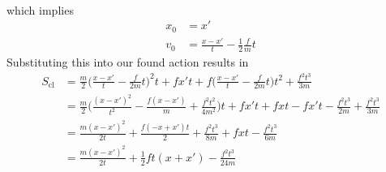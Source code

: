 \documentclass[../principles-of-quantum-mechanics.tex]{subfiles}
\begin{document}
\begin{questions}
\begin{solution}
\begin{align*}
			\end{align*}
			which implies
			\begin{align*}
				x_0 &= x' \\
				v_0 &= \frac{x - x'}{t} - \frac{1}{2}\frac{f}{m}t
			\end{align*}
			Substituting this into our found action results in
			\begin{align*}
				S_{\text{cl}} &= \frac{m}{2}\Big(\frac{x - x'}{t} - \frac{f}{2m}t\Big)^2t + fx't + f\Big(\frac{x - x'}{t} - \frac{f}{2m}t\Big)t^2 + \frac{f^2t^3}{3m} \\
				&= \frac{m}{2}\Big(\frac{(x - x')^2}{t^2} - \frac{f(x - x')}{m} + \frac{f^2t^2}{4m^2}\Big)t + fx't + fxt - fx't - \frac{f^2t^3}{2m} + \frac{f^2t^3}{3m} \\
				&= \frac{m(x - x')^2}{2t} + \frac{f(-x + x')t}{2} + \frac{f^2t^3}{8m} + fxt - \frac{f^2t^3}{6m} \\
				&= \frac{m(x - x')^2}{2t} + \frac{1}{2}ft(x + x') - \frac{f^2t^3}{24m}
			\end{align*}
		\end{solution}
		

\end{questions}
\end{document}
